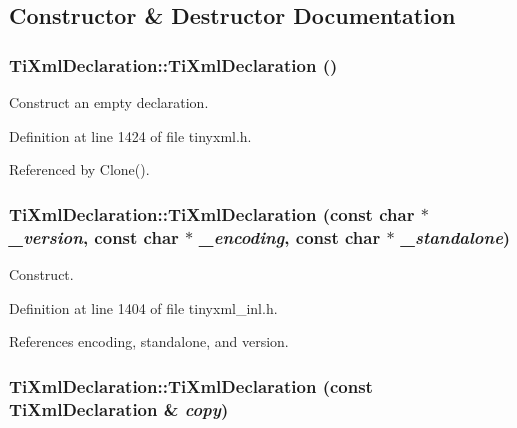 \subsection{Constructor \& Destructor Documentation}
\hypertarget{class_ti_xml_declaration_aa0484d059bea0ea1acb47c9094382d79}{
\subsubsection[{TiXmlDeclaration}]{\setlength{\rightskip}{0pt plus 5cm}TiXmlDeclaration::TiXmlDeclaration ()}}
\label{class_ti_xml_declaration_aa0484d059bea0ea1acb47c9094382d79}


Construct an empty declaration. 

Definition at line 1424 of file tinyxml.h.

Referenced by Clone().\hypertarget{class_ti_xml_declaration_a3b618d1c30c25e4b7a71f31a595ee298}{
\subsubsection[{TiXmlDeclaration}]{\setlength{\rightskip}{0pt plus 5cm}TiXmlDeclaration::TiXmlDeclaration (const char $\ast$ {\em \_\-version}, \/  const char $\ast$ {\em \_\-encoding}, \/  const char $\ast$ {\em \_\-standalone})}}
\label{class_ti_xml_declaration_a3b618d1c30c25e4b7a71f31a595ee298}


Construct. 

Definition at line 1404 of file tinyxml\_\-inl.h.

References encoding, standalone, and version.\hypertarget{class_ti_xml_declaration_a58ac9042c342f7845c8491da0bb091e8}{
\subsubsection[{TiXmlDeclaration}]{\setlength{\rightskip}{0pt plus 5cm}TiXmlDeclaration::TiXmlDeclaration (const {\bf TiXmlDeclaration} \& {\em copy})}}
\label{class_ti_xml_declaration_a58ac9042c342f7845c8491da0bb091e8}


